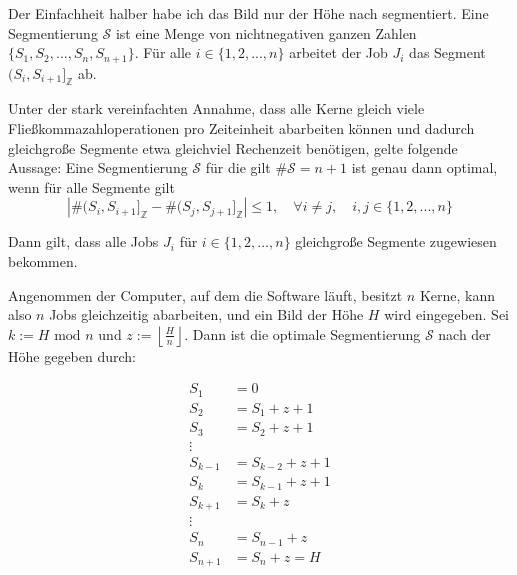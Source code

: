 \documentclass[a4paper, 11pt]{report}
\theoremstyle{definition}
\begin{document}
			Der Einfachheit halber habe ich das Bild nur der Höhe nach segmentiert. Eine Segmentierung $\mathcal{S}$ ist eine Menge von nichtnegativen ganzen Zahlen $\{S_1, S_2, ..., S_n, S_{n+1}\}$. Für alle $i \in \{1,2,...,n\}$ arbeitet der Job $J_i$ das Segment $(S_i, S_{i+1}]_\mathbb{Z}$ ab.


			Unter der stark vereinfachten Annahme, dass alle Kerne gleich viele Fließkommazahloperationen pro Zeiteinheit abarbeiten können und dadurch gleichgroße Segmente etwa gleichviel Rechenzeit benötigen, gelte folgende Aussage: Eine Segmentierung $\mathcal{S}$ für die gilt $\#\mathcal{S} = n+1$ ist genau dann optimal, wenn für alle Segmente gilt
			$$|\#(S_i, S_{i+1}]_\mathbb{Z} - \#(S_j, S_{j+1}]_\mathbb{Z}| \leq 1, \quad \forall i \neq j, \quad i,j \in \{1,2,...,n\}$$

			Dann gilt, dass alle Jobs $J_i$ für $i \in \{1,2,...,n\}$ gleichgroße Segmente zugewiesen bekommen.

			Angenommen der Computer, auf dem die Software läuft, besitzt $n$ Kerne, kann also $n$ Jobs gleichzeitig abarbeiten, und ein Bild der Höhe $H$ wird eingegeben. Sei $k := H \text{ mod } n$ und $z := \left\lfloor \frac{H}{n} \right\rfloor$. Dann ist die optimale Segmentierung $\mathcal{S}$ nach der Höhe gegeben durch:

			\begin{align*}
			S_1 	&= 					0		\\
			S_2 	&= S_1		+	z + 1		\\
			S_3 	&= S_2 		+ 	z + 1		\\
								\vdots			\\
			S_{k-1} &= S_{k-2}	+ 	z + 1		\\
			S_{k}	&= S_{k-1} 	+ 	z + 1		\\
			S_{k+1} &= S_k 		+ 	z			\\
								\vdots			\\
			S_{n} 	&= S_{n-1} 	+ 	z 			\\
			S_{n+1} &= S_{n}	+	z  = H	\\
			\end{align*}

			
\end{document}
